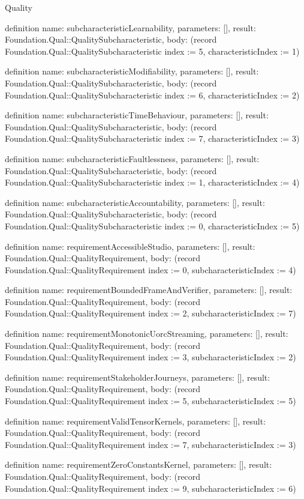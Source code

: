 \begin{lexlean}{Quality}
\begin{semanticmodule}
definition{
  name: subcharacteristicLearnability,
  parameters: [],
  result: Foundation.Qual::QualitySubcharacteristic,
  body: (record Foundation.Qual::QualitySubcharacteristic {index := 5, characteristicIndex := 1})
}

definition{
  name: subcharacteristicModifiability,
  parameters: [],
  result: Foundation.Qual::QualitySubcharacteristic,
  body: (record Foundation.Qual::QualitySubcharacteristic {index := 6, characteristicIndex := 2})
}

definition{
  name: subcharacteristicTimeBehaviour,
  parameters: [],
  result: Foundation.Qual::QualitySubcharacteristic,
  body: (record Foundation.Qual::QualitySubcharacteristic {index := 7, characteristicIndex := 3})
}

definition{
  name: subcharacteristicFaultlessness,
  parameters: [],
  result: Foundation.Qual::QualitySubcharacteristic,
  body: (record Foundation.Qual::QualitySubcharacteristic {index := 1, characteristicIndex := 4})
}

definition{
  name: subcharacteristicAccountability,
  parameters: [],
  result: Foundation.Qual::QualitySubcharacteristic,
  body: (record Foundation.Qual::QualitySubcharacteristic {index := 0, characteristicIndex := 5})
}

definition{
  name: requirementAccessibleStudio,
  parameters: [],
  result: Foundation.Qual::QualityRequirement,
  body: (record Foundation.Qual::QualityRequirement {index := 0, subcharacteristicIndex := 4})
}

definition{
  name: requirementBoundedFrameAndVerifier,
  parameters: [],
  result: Foundation.Qual::QualityRequirement,
  body: (record Foundation.Qual::QualityRequirement {index := 2, subcharacteristicIndex := 7})
}

definition{
  name: requirementMonotonicUorcStreaming,
  parameters: [],
  result: Foundation.Qual::QualityRequirement,
  body: (record Foundation.Qual::QualityRequirement {index := 3, subcharacteristicIndex := 2})
}

definition{
  name: requirementStakeholderJourneys,
  parameters: [],
  result: Foundation.Qual::QualityRequirement,
  body: (record Foundation.Qual::QualityRequirement {index := 5, subcharacteristicIndex := 5})
}

definition{
  name: requirementValidTensorKernels,
  parameters: [],
  result: Foundation.Qual::QualityRequirement,
  body: (record Foundation.Qual::QualityRequirement {index := 7, subcharacteristicIndex := 3})
}

definition{
  name: requirementZeroConstantsKernel,
  parameters: [],
  result: Foundation.Qual::QualityRequirement,
  body: (record Foundation.Qual::QualityRequirement {index := 9, subcharacteristicIndex := 6})
}


\end{semanticmodule}
\end{lexlean}
